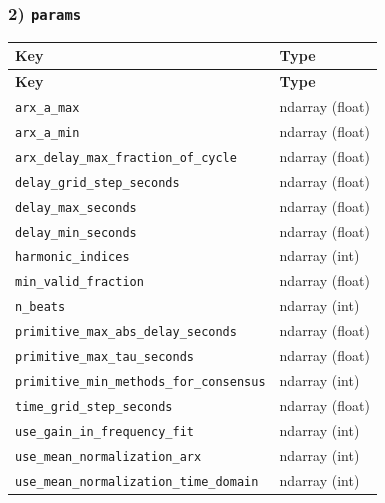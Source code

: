 \documentclass[11pt]{article}
\begin{document}
\subsubsection*{2) \texttt{params}}
\begin{longtable}{|p{}|p{}|}
\hline
\textbf{Key} & \textbf{Type} \\ \hline
\endfirsthead
\hline
\textbf{Key} & \textbf{Type} \\ \hline
\endhead
\texttt{arx\_\allowbreak{}a\_\allowbreak{}max} & ndarray (float) \\ \hline
\texttt{arx\_\allowbreak{}a\_\allowbreak{}min} & ndarray (float) \\ \hline
\texttt{arx\_\allowbreak{}delay\_\allowbreak{}max\_\allowbreak{}fraction\_\allowbreak{}of\_\allowbreak{}cycle} & ndarray (float) \\ \hline
\texttt{delay\_\allowbreak{}grid\_\allowbreak{}step\_\allowbreak{}seconds} & ndarray (float) \\ \hline
\texttt{delay\_\allowbreak{}max\_\allowbreak{}seconds} & ndarray (float) \\ \hline
\texttt{delay\_\allowbreak{}min\_\allowbreak{}seconds} & ndarray (float) \\ \hline
\texttt{harmonic\_\allowbreak{}indices} & ndarray (int) \\ \hline
\texttt{min\_\allowbreak{}valid\_\allowbreak{}fraction} & ndarray (float) \\ \hline
\texttt{n\_\allowbreak{}beats} & ndarray (int) \\ \hline
\texttt{primitive\_\allowbreak{}max\_\allowbreak{}abs\_\allowbreak{}delay\_\allowbreak{}seconds} & ndarray (float) \\ \hline
\texttt{primitive\_\allowbreak{}max\_\allowbreak{}tau\_\allowbreak{}seconds} & ndarray (float) \\ \hline
\texttt{primitive\_\allowbreak{}min\_\allowbreak{}methods\_\allowbreak{}for\_\allowbreak{}consensus} & ndarray (int) \\ \hline
\texttt{time\_\allowbreak{}grid\_\allowbreak{}step\_\allowbreak{}seconds} & ndarray (float) \\ \hline
\texttt{use\_\allowbreak{}gain\_\allowbreak{}in\_\allowbreak{}frequency\_\allowbreak{}fit} & ndarray (int) \\ \hline
\texttt{use\_\allowbreak{}mean\_\allowbreak{}normalization\_\allowbreak{}arx} & ndarray (int) \\ \hline
\texttt{use\_\allowbreak{}mean\_\allowbreak{}normalization\_\allowbreak{}time\_\allowbreak{}domain} & ndarray (int) \\ \hline
\end{longtable}
\end{document}
